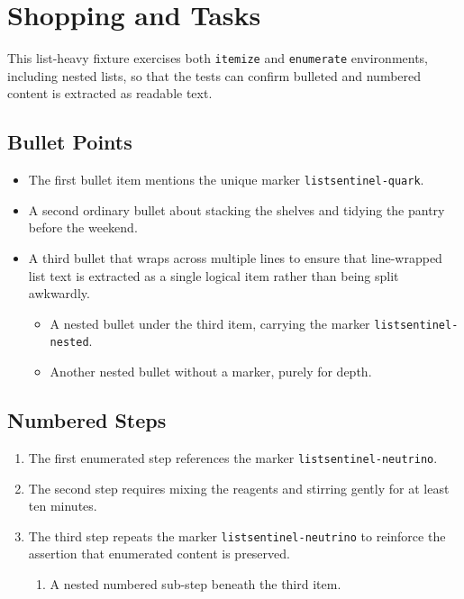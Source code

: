 \documentclass{article}
\begin{document}
\setlength{\labelsep}{0pt}

\section{Shopping and Tasks}
This list-heavy fixture exercises both \texttt{itemize} and \texttt{enumerate}
environments, including nested lists, so that the tests can confirm bulleted
and numbered content is extracted as readable text.

\subsection{Bullet Points}
\begin{itemize}
  \item The first bullet item mentions the unique marker
        \texttt{listsentinel-quark}.
  \item A second ordinary bullet about stacking the shelves and tidying the
        pantry before the weekend.
  \item A third bullet that wraps across multiple lines to ensure that
        line-wrapped list text is extracted as a single logical item rather
        than being split awkwardly.
  \begin{itemize}
    \item A nested bullet under the third item, carrying the marker
          \texttt{listsentinel-nested}.
    \item Another nested bullet without a marker, purely for depth.
  \end{itemize}
\end{itemize}

\subsection{Numbered Steps}
\begin{enumerate}
  \item The first enumerated step references the marker
        \texttt{listsentinel-neutrino}.
  \item The second step requires mixing the reagents and stirring gently for
        at least ten minutes.
  \item The third step repeats the marker \texttt{listsentinel-neutrino} to
        reinforce the assertion that enumerated content is preserved.
  \begin{enumerate}
    \item A nested numbered sub-step beneath the third item.
  \end{enumerate}
\end{enumerate}
\end{document}
